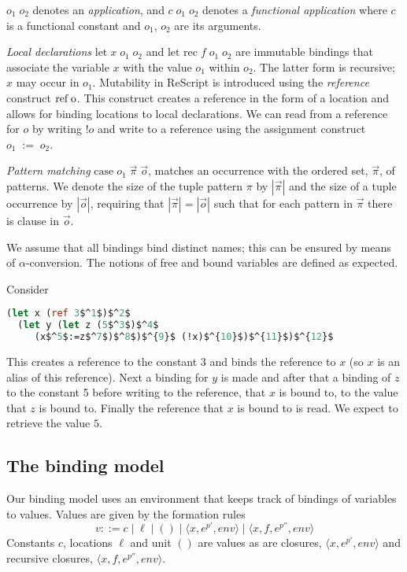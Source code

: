 \documentclass{llncs}
\begin{document}
$o_1\;o_2$ denotes an \emph{application}, and $c\;o_1\;o_2$ denotes a
\emph{functional application} where $c$ is a functional constant and
$o_1$, $o_2$ are its arguments.

\emph{Local declarations} $\mbox{let} \; x \; o_1 \; o_2$ and
$\mbox{let rec} \; f \; o_1 \; o_2$ are immutable bindings that
associate the variable $x$ with the value $o_1$ within $o_2$. The latter
form is recursive; $x$ may occur in $o_1$. Mutability
in ReScript is introduced using the \emph{reference} construct
$\mbox{ref\;o}$. This construct creates a reference in the form of a
location and allows for binding locations to local declarations. We
can read from a reference for $o$ by writing $!o$ and write to a
reference using the assignment construct $o_1\;:=\;o_2$. 

\emph{Pattern matching} $\mbox{case} \; o_1 \; \vec{\pi} \; \vec{o}$,
matches an occurrence with the ordered set, $\vec{\pi}$, of patterns.
We denote the size of the tuple pattern $\pi$ by $|\vec{\pi}|$ and the
size of a tuple occurrence by $|\vec{o}|$, requiring that
$|\vec{\pi}| = |\vec{o}|$ such that for each pattern in $\vec{\pi}$
there is clause in $\vec{o}$.

We assume that all bindings bind distinct names; this can be ensured
by means of $\alpha$-conversion. The notions of free and bound
variables are defined as expected. 

\begin{example}\label{ex:write}
Consider
\begin{lstlisting}[language=Caml, mathescape=true]
  (let x (ref 3$^1$)$^2$
  (let y (let z (5$^3$)$^4$
     (x$^5$:=z$^7$)$^8$)$^{9}$ (!x)$^{10}$)$^{11}$)$^{12}$
\end{lstlisting}
This creates a reference to the constant 3 and binds the reference to
$x$ (so $x$ is an alias of this reference). Next a binding for $y$ is
made and after that a binding of $z$ to the constant 5 before writing
to the reference, that $x$ is bound to, to the value that $z$ is bound
to.  Finally the reference that $x$ is bound to is read. We expect to
retrieve the value $5$.
\end{example}

\subsection{The binding model}\label{sec:EnvSto}

Our binding model uses an environment that keeps
track of bindings of variables to values. Values are given by the formation rules
%
\[ v ::= c \mid \ell \mid () \mid \langle x,e^{p'},env\rangle \mid \langle
  x,f,e^{p''},env\rangle \]
%
Constants $c$, locations $\ell$ and unit $()$ are values as are closures, $\langle
x,e^{p'},env\rangle$ and recursive closures, $\langle x,f,e^{p''},env\rangle$.
\end{document}
